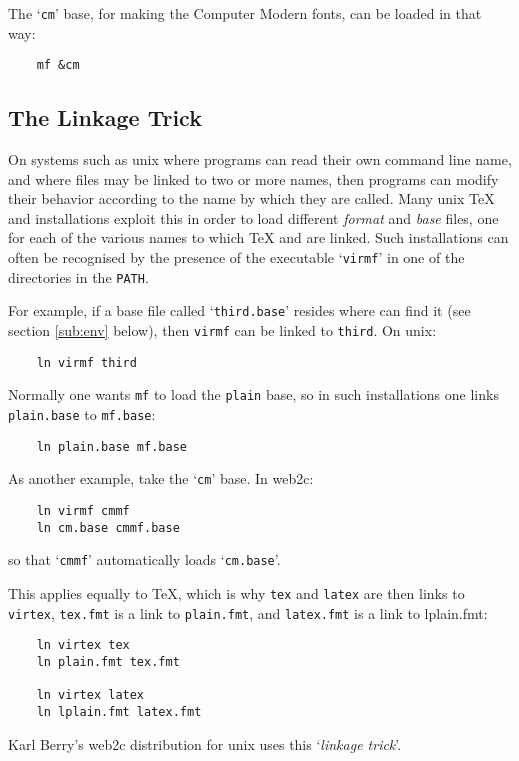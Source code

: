 The `{\tt cm}' base, for making the {\sc Computer Modern} fonts,
can be loaded in that way:
\begin{verbatim}
    mf &cm
\end{verbatim}


\subsection{The Linkage Trick}\label{sub:link}

On systems such as {\sc unix} where programs can read their own
command line name, and where files may be linked to two or more
names, then programs can modify their behavior according to the
name by which they are called.  Many {\sc unix} \TeX{} and \MF{}
installations exploit this in order to load different {\em format\/}
and {\em base\/} files, one for each of the various names to which
\TeX{} and \MF{} are linked.  Such installations can often
be recognised by the presence of the executable `{\tt virmf}'
in one of the directories in the {\tt PATH}.

For example, if a base file called `{\tt third.base}' resides where
\MF{} can find it (see section \ref{sub:env} below), then
{\tt virmf} can be linked to {\tt third}.  On {\sc unix}:
\begin{verbatim}
    ln virmf third
\end{verbatim}

Normally one wants {\tt mf} to load the {\tt plain} base,
so in such installations one links {\tt plain.base} to {\tt mf.base}:
\begin{verbatim}
    ln plain.base mf.base
\end{verbatim}

As another example, take the `{\tt cm}' base.  In {\sf web2c}:
\begin{verbatim}
    ln virmf cmmf
    ln cm.base cmmf.base
\end{verbatim}
so that `{\tt cmmf}' automatically loads `{\tt cm.base}'.

This applies equally to \TeX{}, which is why {\tt tex} and {\tt latex}
are then links to {\tt virtex}, {\tt tex.fmt} is a link to
{\tt plain.fmt}, and {\tt latex.fmt} is a link to {lplain.fmt}:
\begin{verbatim}
    ln virtex tex
    ln plain.fmt tex.fmt

    ln virtex latex
    ln lplain.fmt latex.fmt
\end{verbatim}

Karl {\sc Berry\/}'s {\sf web2c} distribution for {\sc unix} uses
this `{\em linkage trick}'.

